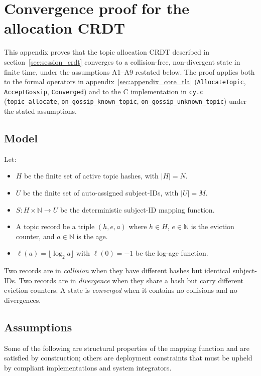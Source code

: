 \chapter{Convergence proof for the allocation CRDT}\label{sec:appendix_proof}

This appendix proves that the topic allocation CRDT described in
section~\ref{sec:session_crdt} converges to a collision-free, non-divergent
state in finite time, under the assumptions A1--A9 restated below.
The proof applies both to the formal operators in
appendix~\ref{sec:appendix_core_tla} (\texttt{AllocateTopic},
\texttt{AcceptGossip}, \texttt{Converged}) and to the C implementation in
\texttt{cy.c} (\texttt{topic\_allocate}, \texttt{on\_gossip\_known\_topic},
\texttt{on\_gossip\_unknown\_topic}) under the stated assumptions.

\section{Model}\label{sec:appendix_proof_model}

Let:

\begin{itemize}
    \item $H$ be the finite set of active topic hashes, with $|H| = N$.
    \item $U$ be the finite set of auto-assigned subject-IDs, with $|U| = M$.
    \item $S : H \times \mathbb{N} \to U$ be the deterministic subject-ID
    mapping function.
    \item A topic record be a triple $(h, e, a)$ where $h \in H$,
    $e \in \mathbb{N}$ is the eviction counter, and $a \in \mathbb{N}$ is
    the age.
    \item $\ell(a) = \lfloor \log_2 a \rfloor$ with $\ell(0) = -1$ be the
    log-age function.
\end{itemize}

Two records are in \emph{collision} when they have different hashes but
identical subject-IDs. Two records are in \emph{divergence} when they share
a hash but carry different eviction counters. A state is \emph{converged}
when it contains no collisions and no divergences.

\section{Assumptions}\label{sec:appendix_proof_assumptions}

Some of the following are structural properties of the mapping function and
are satisfied by construction; others are deployment constraints that must
be upheld by compliant implementations and system integrators.

